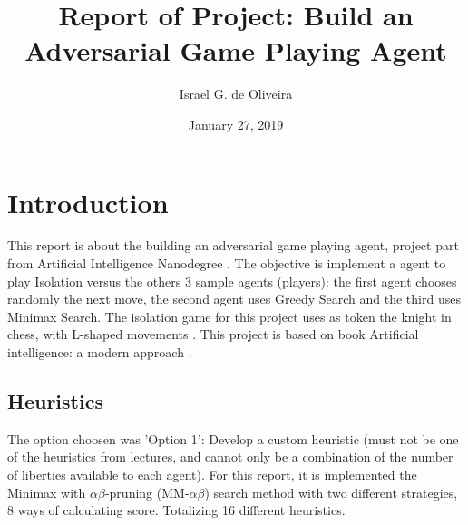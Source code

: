 \documentclass[a4paper]{article}
\title{Report of Project: Build an Adversarial Game Playing Agent}
\author{Israel G. de Oliveira}
\date{January 27, 2019}
\begin{document}
\maketitle

\section{Introduction}
This report is about the building an adversarial game playing agent, project part from Artificial Intelligence Nanodegree \cite{githubUdacityAIND}. The objective is implement a agent to play Isolation versus the others 3 sample agents (players): the first agent chooses randomly the next move, the second agent uses Greedy Search and the third uses Minimax Search. The isolation game for this project uses as token the knight in chess, with L-shaped movements \cite{githubUdacityAINDProj3}. This project is based on book Artificial intelligence: a modern approach \cite{russell2009artificial}.

\subsection{Heuristics}

The option choosen was 'Option 1': Develop a custom heuristic (must not be one of the heuristics from lectures, and cannot only be a combination of the number of liberties available to each agent). For this report, it is implemented the Minimax with $\alpha\beta$-pruning (MM-$\alpha\beta$) \cite{elnaggar2014comparative} search method with two different strategies, 8 ways of calculating score. Totalizing 16 different heuristics.
\end{document}
